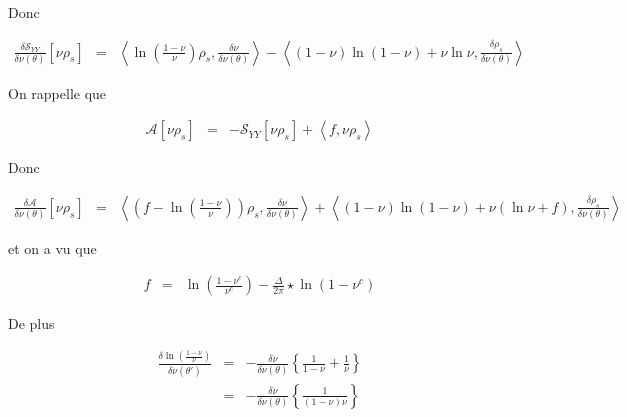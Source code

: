 Donc 

\begin{eqnarray*}
	\frac{ \delta\mathcal{S}_{YY}}{\delta \nu ( \theta ) } [ \nu \rho_s ] & = &  \left \langle  \ln \left ( \frac{ 1 - \nu }{\nu } \right )\rho_s ,  \frac{\delta \nu }{ \delta \nu(\theta )}\right \rangle   - \left \langle \left (1 - \nu  \right ) \ln\left (1 - \nu \right ) + \nu \ln  \nu   , \frac{ \delta \rho_s}{\delta \nu ( \theta )}  \right \rangle  
\end{eqnarray*}

On rappelle que 

\begin{eqnarray*}
	\mathcal{A}[ \nu \rho_s ] & = &  - \mathcal{S}_{YY}[ \nu \rho_s ] + \left \langle f , \nu \rho_s \right \rangle 	
\end{eqnarray*}

Donc 

\begin{eqnarray*}
	\frac{ \delta \mathcal{A}}{\delta \nu ( \theta)} [ \nu \rho_s ] & = &  \left \langle  \left ( f - \ln \left ( \frac{ 1 - \nu }{\nu } \right ) \right )\rho_s , \frac{\delta \nu }{ \delta \nu(\theta )}  \right \rangle   + \left \langle \left (1 - \nu  \right ) \ln\left (1 - \nu \right ) + \nu \left (  \ln  \nu   + f  \right )  , \frac{ \delta \rho_s}{\delta \nu ( \theta )}  \right \rangle  	
\end{eqnarray*}

et on a vu que

\begin{eqnarray*}
	f & = & \ln \left ( \frac{ 1 - \nu^c}{ \nu^c }\right )  - \frac{ \Delta}{2\pi}\star \ln ( 1 - \nu^c  )  	
\end{eqnarray*}

De plus 

\begin{eqnarray*}
	\frac{ \delta \ln \left ( \frac{ 1 - \nu }{ \nu } \right ) }{ \delta \nu ( \theta' ) } & = & - \frac{\delta \nu }{ \delta \nu(\theta )} \left \{  \frac{ 1}{ 1 - \nu} + \frac{1}{\nu} \right \} \\
	& = & - \frac{\delta \nu }{ \delta \nu(\theta )} \left \{   \frac{ 1}{ (1 - \nu)\nu } \right  \} 	
\end{eqnarray*}

